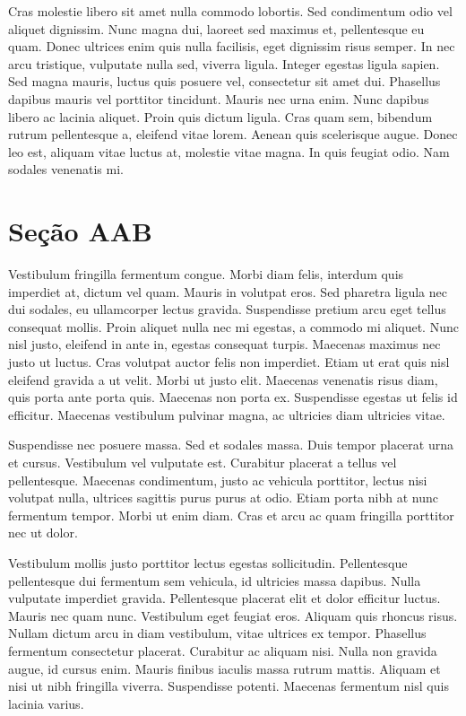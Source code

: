 \documentclass{article}
\begin{document}
	Cras molestie libero sit amet nulla commodo lobortis. Sed condimentum odio vel aliquet dignissim. Nunc magna dui, laoreet sed maximus et, pellentesque eu quam. Donec ultrices enim quis nulla facilisis, eget dignissim risus semper. In nec arcu tristique, vulputate nulla sed, viverra ligula. Integer egestas ligula sapien. Sed magna mauris, luctus quis posuere vel, consectetur sit amet dui. Phasellus dapibus mauris vel porttitor tincidunt. Mauris nec urna enim. Nunc dapibus libero ac lacinia aliquet. Proin quis dictum ligula. Cras quam sem, bibendum rutrum pellentesque a, eleifend vitae lorem. Aenean quis scelerisque augue. Donec leo est, aliquam vitae luctus at, molestie vitae magna. In quis feugiat odio. Nam sodales venenatis mi.
	
	\section{Seção AAB}
	
	Vestibulum fringilla fermentum congue. Morbi diam felis, interdum quis imperdiet at, dictum vel quam. Mauris in volutpat eros. Sed pharetra ligula nec dui sodales, eu ullamcorper lectus gravida. Suspendisse pretium arcu eget tellus consequat mollis. Proin aliquet nulla nec mi egestas, a commodo mi aliquet. Nunc nisl justo, eleifend in ante in, egestas consequat turpis. Maecenas maximus nec justo ut luctus. Cras volutpat auctor felis non imperdiet. Etiam ut erat quis nisl eleifend gravida a ut velit. Morbi ut justo elit. Maecenas venenatis risus diam, quis porta ante porta quis. Maecenas non porta ex. Suspendisse egestas ut felis id efficitur. Maecenas vestibulum pulvinar magna, ac ultricies diam ultricies vitae.
	
	Suspendisse nec posuere massa. Sed et sodales massa. Duis tempor placerat urna et cursus. Vestibulum vel vulputate est. Curabitur placerat a tellus vel pellentesque. Maecenas condimentum, justo ac vehicula porttitor, lectus nisi volutpat nulla, ultrices sagittis purus purus at odio. Etiam porta nibh at nunc fermentum tempor. Morbi ut enim diam. Cras et arcu ac quam fringilla porttitor nec ut dolor.
	
	Vestibulum mollis justo porttitor lectus egestas sollicitudin. Pellentesque pellentesque dui fermentum sem vehicula, id ultricies massa dapibus. Nulla vulputate imperdiet gravida. Pellentesque placerat elit et dolor efficitur luctus. Mauris nec quam nunc. Vestibulum eget feugiat eros. Aliquam quis rhoncus risus. Nullam dictum arcu in diam vestibulum, vitae ultrices ex tempor. Phasellus fermentum consectetur placerat. Curabitur ac aliquam nisi. Nulla non gravida augue, id cursus enim. Mauris finibus iaculis massa rutrum mattis. Aliquam et nisi ut nibh fringilla viverra. Suspendisse potenti. Maecenas fermentum nisl quis lacinia varius.
	
\end{document}
